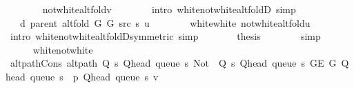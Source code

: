 \begin{isabellebody}
\ \ \ \ \ \ \isamarkupfalse%
\ not{\isacharunderscore}{\kern0pt}white{\isacharunderscore}{\kern0pt}alt{\isacharunderscore}{\kern0pt}fold{\isacharunderscore}{\kern0pt}v\isanewline
\ \ \ \ \ \ \isamarkupfalse%
\ {\isacharparenleft}{\kern0pt}intro\ white{\isacharunderscore}{\kern0pt}not{\isacharunderscore}{\kern0pt}white{\isacharunderscore}{\kern0pt}alt{\isacharunderscore}{\kern0pt}foldD{\isacharparenleft}{\kern0pt}{}{\isacharparenright}{\kern0pt}{\isacharparenright}{\kern0pt}\ simp\isanewline
\ \ \ \ \isamarkupfalse%
\ \isamarkupfalse%
\ {\isachardoublequoteopen}{\isachardot}{\kern0pt}{\isachardot}{\kern0pt}{\isachardot}{\kern0pt}\ {\isacharequal}{\kern0pt}\ d\ {\isacharparenleft}{\kern0pt}parent\ {\isacharparenleft}{\kern0pt}alt{\isacharunderscore}{\kern0pt}fold\ G{}\ G{}\ src\ s{\isacharparenright}{\kern0pt}{\isacharparenright}{\kern0pt}\ u{\isachardoublequoteclose}\isanewline
\ \ \ \ \ \ \isamarkupfalse%
\ white{\isacharunderscore}{\kern0pt}white\ not{\isacharunderscore}{\kern0pt}white{\isacharunderscore}{\kern0pt}alt{\isacharunderscore}{\kern0pt}fold{\isacharunderscore}{\kern0pt}u\isanewline
\ \ \ \ \ \ \isamarkupfalse%
\ {\isacharparenleft}{\kern0pt}intro\ white{\isacharunderscore}{\kern0pt}not{\isacharunderscore}{\kern0pt}white{\isacharunderscore}{\kern0pt}alt{\isacharunderscore}{\kern0pt}foldD{\isacharparenleft}{\kern0pt}{}{\isacharparenright}{\kern0pt}{\isacharbrackleft}{\kern0pt}symmetric{\isacharbrackright}{\kern0pt}{\isacharparenright}{\kern0pt}\ simp\isanewline
\ \ \ \ \isamarkupfalse%
\ \isamarkupfalse%
\ {\isacharquery}{\kern0pt}thesis\isanewline
\ \ \ \ \ \ \isamarkupfalse%
\ simp\isanewline
\ \ \isamarkupfalse%
\isanewline
\ \ \ \ \isamarkupfalse%
\ white{\isacharunderscore}{\kern0pt}not{\isacharunderscore}{\kern0pt}white\isanewline
\ \ \ \ \isamarkupfalse%
\ alt{\isacharunderscore}{\kern0pt}path{\isacharunderscore}{\kern0pt}Cons{\isacharcolon}{\kern0pt}\ {\isachardoublequoteopen}alt{\isacharunderscore}{\kern0pt}path\ {\isacharparenleft}{\kern0pt}Q\ s\ {\isacharparenleft}{\kern0pt}Q{\isacharunderscore}{\kern0pt}head\ {\isacharparenleft}{\kern0pt}queue\ s{\isacharparenright}{\kern0pt}{\isacharparenright}{\kern0pt}{\isacharparenright}{\kern0pt}\ {\isacharparenleft}{\kern0pt}Not\ {\isasymcirc}\ Q\ s\ {\isacharparenleft}{\kern0pt}Q{\isacharunderscore}{\kern0pt}head\ {\isacharparenleft}{\kern0pt}queue\ s{\isacharparenright}{\kern0pt}{\isacharparenright}{\kern0pt}{\isacharparenright}{\kern0pt}\ {\isacharparenleft}{\kern0pt}G{\isachardot}{\kern0pt}E\ G{\isacharparenright}{\kern0pt}\ {\isacharparenleft}{\kern0pt}Q{\isacharunderscore}{\kern0pt}head\ {\isacharparenleft}{\kern0pt}queue\ s{\isacharparenright}{\kern0pt}\ {\isacharhash}{\kern0pt}\ p{\isacharparenright}{\kern0pt}\ {\isacharparenleft}{\kern0pt}Q{\isacharunderscore}{\kern0pt}head\ {\isacharparenleft}{\kern0pt}queue\ s{\isacharparenright}{\kern0pt}{\isacharparenright}{\kern0pt}\ v{\isachardoublequoteclose}\isanewline

\end{isabellebody}
